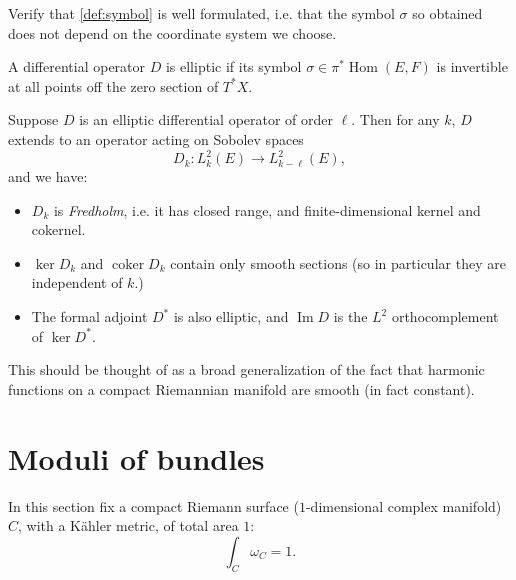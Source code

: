 \documentclass[12pt,letterpaper,reqno]{article}
\numberwithin{equation}{section}
\newcommand{\R}{\ensuremath{\mathbb R}}
\newcommand{\kahler}{K\"ahler\xspace}
\newcommand{\ti}[1]{\textit{#1}}
\DeclareMathOperator{\im}{Im}
\DeclareMathOperator{\Hom}{Hom}
\DeclareMathOperator{\coker}{coker}
\begin{document}
\begin{exercise} Verify that \autoref{def:symbol}
is well formulated, i.e. that the symbol $\sigma$ so obtained
does not depend on the coordinate system we choose.
\end{exercise}

\begin{defn}
A differential operator $D$ is elliptic if its
symbol $\sigma \in \pi^* \Hom(E,F)$ is invertible
at all points off the zero section of $T^* X$.
\end{defn}

\begin{thm} \label{thm:elliptic-regularity}
Suppose $D$ is an elliptic differential operator of order $\ell$.
Then for any $k$,
$D$ extends to an operator acting on Sobolev spaces
$$D_k: L^2_k(E) \to L^2_{k-\ell}(E),$$
and we have:
\begin{itemize}
\item $D_k$ is \ti{Fredholm}, i.e. it has closed range,
and finite-dimensional
kernel and cokernel.
\item $\ker D_k$ and $\coker D_k$ contain only
smooth sections (so in particular they are independent of $k$.)
\item The formal adjoint $D^*$ is also elliptic, and
$\im D$ is the $L^2$ orthocomplement of $\ker D^*$.
\end{itemize}
\end{thm}

This should be thought of as a broad generalization of the
fact that harmonic functions on a compact Riemannian manifold
are smooth (in fact constant).



\section{Moduli of bundles}

In this section fix a compact Riemann surface ($1$-dimensional
complex manifold) $C$, with a \kahler metric, of total area $1$:
\begin{equation}
  \int_C \omega_C = 1.
\end{equation}
\end{document}
